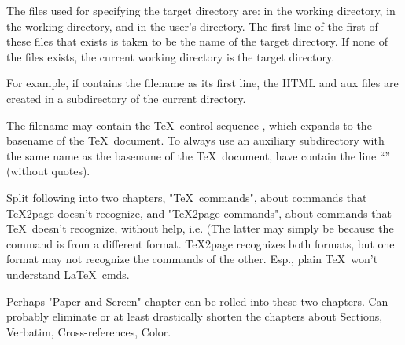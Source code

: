 The files used for specifying the target directory are:
 in the working directory,
 in the working directory, and
 in the user's  directory.
The first line of the first of these files that exists
is taken to be the name of the target directory.
If none of the files exists, the current working
directory is the target directory.

For example, if  contains the filename
 as its first line, the HTML and aux files are
created in a subdirectory  of the
current directory.


The filename may contain the \TeX\ control sequence
\p{\jobname}, which expands to the basename of
the \TeX\ document.  To always use an auxiliary
subdirectory with the same name as the basename of the
\TeX\ document, have  contain the
line ``\p{\jobname}'' (without quotes).

\iffalse
beginsection Info files

If a \TeX2page-generated set of HTML files is largely text, it can be
read using text-based browsers such as Lynx~\cite{lynx}.  However, many
people would rather view it as an Info~\cite{texinfo} document. Info files can be
browsed very rapidly in a text editor or a lightweight console browser;
allow convenient regex search across the entire document; and can
be read as plain text as they have much less markup than the
corresponding HTML.

The \TeX2page distribution includes a script \p{t2p2info} for converting
\TeX2page-generated HTML into Info.  \p{t2p2info} takes as argument the
filename of the main HTML file generated by \TeX2page, e.g.,

\p{
t2p2info jobname.html
}
The result is one or more Info files, the first of them named
\p{jobname.info}.
\fi

\iffalse
Split following into two chapters, "\TeX\ commands", about
commands that \TeX2page doesn't recognize,
and
"\TeX2page commands", about commands that \TeX\ doesn't
recognize, without help, i.e.  (The latter may simply be
because the command is from a different format.  \TeX2page
recognizes both formats, but one format may not recognize
the commands of the other.  Esp., plain \TeX\ won't understand
\LaTeX\ cmds.

Perhaps "Paper and Screen" chapter can be rolled into these
two chapters.  Can probably eliminate or at least
drastically shorten the chapters about
Sections, Verbatim, Cross-references, Color.

